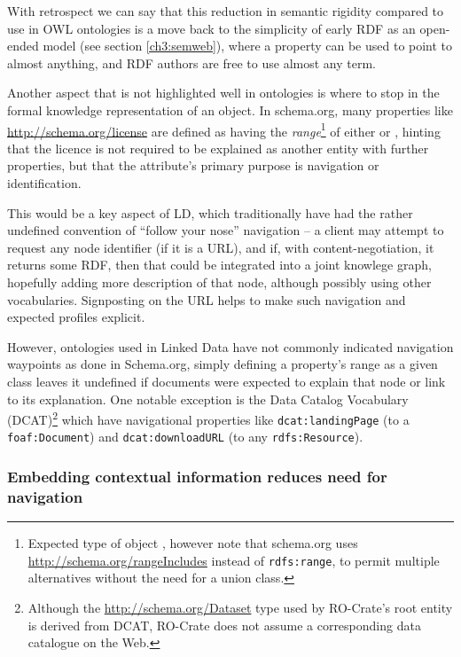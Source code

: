 With retrospect we can say that this reduction in semantic rigidity compared to use in \acrshort{OWL} ontologies is a move back to the simplicity of early RDF as an open-ended model (see section \vref{ch3:semweb}), where a property can be used to point to almost anything, and RDF authors are free to use almost any term.

Another aspect that is not highlighted well in ontologies is where to stop in the formal knowledge representation of an object.
In schema.org, many properties like \url{http://schema.org/license} are defined as having the \emph{range}\footnote{Expected type of object \cite{Guha 2014}, however note that schema.org uses \url{http://schema.org/rangeIncludes} instead of \texttt{rdfs:range}, to permit multiple alternatives without the need for a union class.} of either  or , hinting that the licence is not required to be explained as another entity with further properties, but that the attribute's primary purpose is navigation or identification. 

This would be a key aspect of
\acrlong{LD},
which traditionally have had the rather undefined convention of ``follow your nose'' navigation -- a client may attempt to request any node identifier (if it is a URL), and if, with \gls{content-negotiation}, it returns some RDF, then that could be integrated into a joint knowlege graph, hopefully adding more description of that node, although possibly using other vocabularies.
Signposting on the URL helps to make such navigation and expected profiles explicit.

However, ontologies used in Linked Data have not commonly indicated navigation waypoints as done in Schema.org, simply defining a property's range as a given class leaves it undefined if documents were expected to explain that node or link to its explanation. One notable exception is the Data Catalog Vocabulary (DCAT)\footnote{Although the \url{http://schema.org/Dataset} type used by RO-Crate's root entity is derived from DCAT, RO-Crate does not assume a corresponding data catalogue on the Web.} \cite{Albertoni 2020} which have navigational properties like \texttt{dcat:landingPage} (to a \texttt{foaf:Document}) and \texttt{dcat:downloadURL} (to any \texttt{rdfs:Resource}).


\subsubsection{Embedding contextual information reduces need for navigation}
\label{ch61:contextual}


